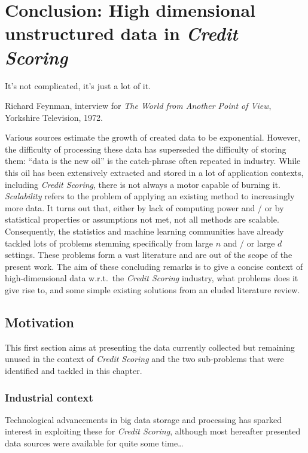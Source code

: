 \chapter*{Conclusion: High dimensional unstructured data in \textit{Credit Scoring}} \label{ccl}


\epigraph{It's not complicated, it's just a lot of it.}{Richard Feynman, interview for \textit{The World from Another Point of View}, Yorkshire Television, 1972.}

\minitoc

Various sources estimate the growth of created data to be exponential. However, the difficulty of processing these data has superseded the difficulty of storing them: ``data is the new oil'' is the catch-phrase often repeated in industry. While this oil has been extensively extracted and stored in a lot of application contexts, including \textit{Credit Scoring}, there is not always a motor capable of burning it. \textit{Scalability} refers to the problem of applying an existing method to increasingly more data. It turns out that, either by lack of computing power and / or by statistical properties or assumptions not met, not all methods are scalable.
Consequently, the statistics and machine learning communities have already tackled lots of problems stemming specifically from large $n$ and / or large $d$ settings.
These problems form a vast literature and are out of the scope of the present work.
The aim of these concluding remarks is to give a concise context of high-dimensional data w.r.t.\ the \textit{Credit Scoring} industry, what problems does it give rise to, and some simple existing solutions from an eluded literature review.

\section{Motivation}

This first section aims at presenting the data currently collected but remaining unused in the context of \textit{Credit Scoring} and the two sub-problems that were identified and tackled in this chapter.

\subsection{Industrial context}

Technological advancements in big data storage and processing has sparked interest in exploiting these for \textit{Credit Scoring}, although most hereafter presented data sources were available for quite some time\dots

